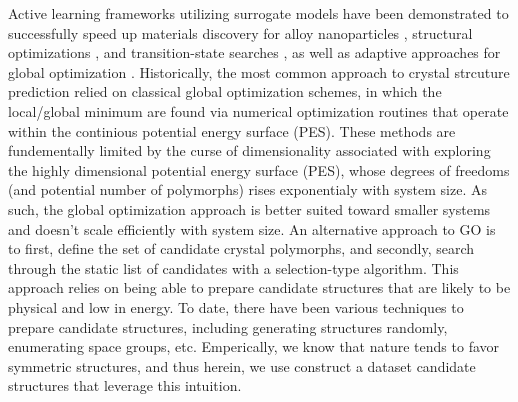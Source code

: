%
Active learning frameworks utilizing surrogate models have been demonstrated to successfully speed up materials discovery for alloy nanoparticles \cite{Jennings2019}, structural optimizations \cite{hansen2019atomistic}, and transition-state searches \cite{torres2019low}, as well as adaptive approaches for global optimization \cite{VanDenBossche2018}.
%
Historically, the most common approach to crystal strcuture prediction relied on classical global optimization schemes,
in which the local/global minimum are found via numerical optimization routines that operate within the continious potential energy surface (PES).
%
These methods are fundementally limited by the curse of dimensionality associated with exploring the highly dimensional potential energy surface (PES),
whose degrees of freedoms (and potential number of polymorphs) rises exponentialy with system size.\cite{Stillinger1999}
%
As such, the global optimization approach is better suited toward smaller systems and doesn't scale efficiently with system size.
%
An alternative approach to GO is to first, define the set of candidate crystal polymorphs, and secondly, search through the static list of candidates with a selection-type algorithm.
%
This approach relies on being able to prepare candidate structures that are likely to be physical and low in energy.
To date, there have been various techniques to prepare candidate structures, including generating structures randomly, enumerating space groups, etc.
%
Emperically, we know that nature tends to favor symmetric structures, and thus herein, we use construct a dataset candidate structures that leverage this intuition.


